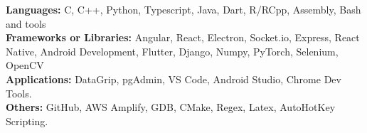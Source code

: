 \vspace{5pt}
{\bf Languages:} C, C++, Python, Typescript, Java, Dart, R/RCpp, Assembly, Bash and tools\\
{\bf Frameworks or Libraries:} Angular, React, Electron, Socket.io, Express,  React Native, Android Development, Flutter, Django, Numpy,  PyTorch, Selenium, OpenCV\\
{\bf Applications:} DataGrip, pgAdmin, VS Code, Android Studio, Chrome Dev Tools.\\
{\bf Others:} GitHub, AWS Amplify, GDB, CMake, Regex, Latex, AutoHotKey Scripting.\\
